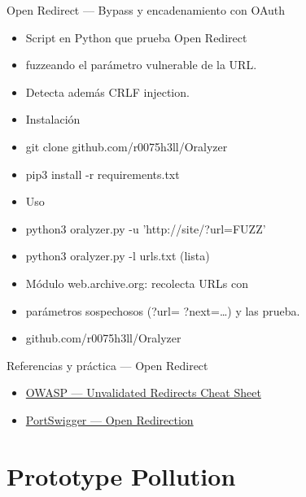 \documentclass[aspectratio=169,10pt]{beamer}
\begin{document}
\begin{frame}[allowframebreaks]{Open Redirect --- Bypass y encadenamiento con OAuth}
\begin{itemize}
  \item Script en Python que prueba Open Redirect
  \item fuzzeando el parámetro vulnerable de la URL.
  \item Detecta además CRLF injection.
  \item Instalación
  \item git clone github.com/r0075h3ll/Oralyzer
  \item pip3 install -r requirements.txt
  \item Uso
  \item python3 oralyzer.py -u 'http://site/?url=FUZZ'
  \item python3 oralyzer.py -l urls.txt (lista)
  \item Módulo web.archive.org: recolecta URLs con
  \item parámetros sospechosos (?url= ?next=\dots{}) y las prueba.
  \item github.com/r0075h3ll/Oralyzer
  \end{itemize}
\end{frame}

\begin{frame}{Referencias y práctica --- Open Redirect}
\footnotesize
  \begin{itemize}
  \item \href{https://cheatsheetseries.owasp.org/cheatsheets/Unvalidated_Redirects_and_Forwards_Cheat_Sheet.html}{OWASP --- Unvalidated Redirects Cheat Sheet}
  \item \href{https://portswigger.net/kb/issues/00500100_open-redirection-reflected}{PortSwigger --- Open Redirection}
  \end{itemize}
\end{frame}

\section{Prototype Pollution}
\end{document}
